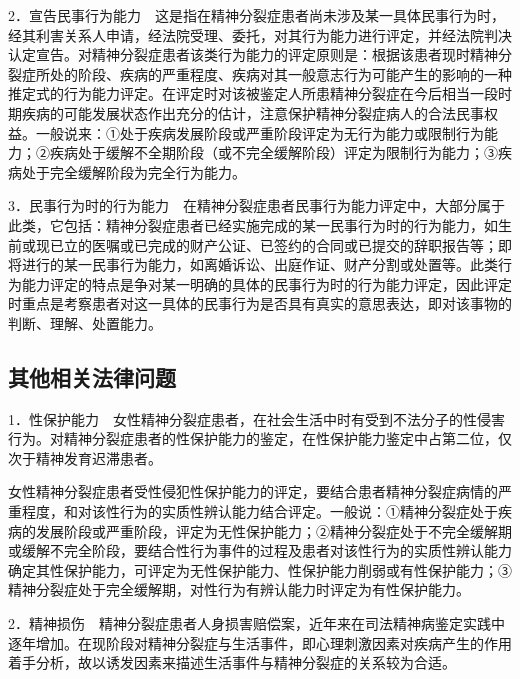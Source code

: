 2．宣告民事行为能力　这是指在精神分裂症患者尚未涉及某一具体民事行为时，经其利害关系人申请，经法院受理、委托，对其行为能力进行评定，并经法院判决认定宣告。对精神分裂症患者该类行为能力的评定原则是：根据该患者现时精神分裂症所处的阶段、疾病的严重程度、疾病对其一般意志行为可能产生的影响的一种推定式的行为能力评定。在评定时对该被鉴定人所患精神分裂症在今后相当一段时期疾病的可能发展状态作出充分的估计，注意保护精神分裂症病人的合法民事权益。一般说来：①处于疾病发展阶段或严重阶段评定为无行为能力或限制行为能力；②疾病处于缓解不全期阶段（或不完全缓解阶段）评定为限制行为能力；③疾病处于完全缓解阶段为完全行为能力。

3．民事行为时的行为能力　在精神分裂症患者民事行为能力评定中，大部分属于此类，它包括：精神分裂症患者已经实施完成的某一民事行为时的行为能力，如生前或现已立的医嘱或已完成的财产公证、已签约的合同或已提交的辞职报告等；即将进行的某一民事行为能力，如离婚诉讼、出庭作证、财产分割或处置等。此类行为能力评定的特点是争对某一明确的具体的民事行为时的行为能力评定，因此评定时重点是考察患者对这一具体的民事行为是否具有真实的意思表达，即对该事物的判断、理解、处置能力。

\subsection{其他相关法律问题}

1．性保护能力　女性精神分裂症患者，在社会生活中时有受到不法分子的性侵害行为。对精神分裂症患者的性保护能力的鉴定，在性保护能力鉴定中占第二位，仅次于精神发育迟滞患者。

女性精神分裂症患者受性侵犯性保护能力的评定，要结合患者精神分裂症病情的严重程度，和对该性行为的实质性辨认能力结合评定。一般说：①精神分裂症处于疾病的发展阶段或严重阶段，评定为无性保护能力；②精神分裂症处于不完全缓解期或缓解不完全阶段，要结合性行为事件的过程及患者对该性行为的实质性辨认能力确定其性保护能力，可评定为无性保护能力、性保护能力削弱或有性保护能力；③精神分裂症处于完全缓解期，对性行为有辨认能力时评定为有性保护能力。

2．精神损伤　精神分裂症患者人身损害赔偿案，近年来在司法精神病鉴定实践中逐年增加。在现阶段对精神分裂症与生活事件，即心理刺激因素对疾病产生的作用着手分析，故以诱发因素来描述生活事件与精神分裂症的关系较为合适。

